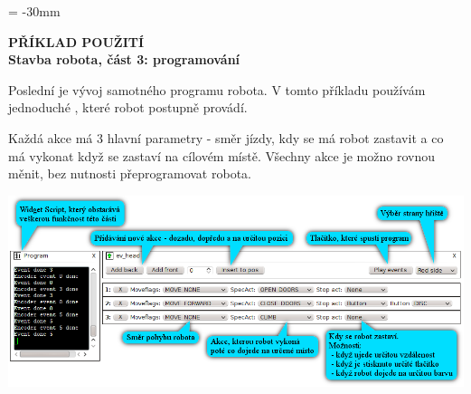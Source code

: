 \documentclass[12pt, a4paper, oneside]{article}
\newcommand{\B}{\textbf} %
\begin{document}
\newpage
\begin{landscape}
\voffset = -30mm %
\begin{center}
    \Large \B{PŘÍKLAD POUŽITÍ \\ Stavba robota, část 3: programování}
\end{center}
\vspace{5mm}
Poslední je vývoj samotného programu robota. V tomto příkladu používám jednoduché , které robot postupně provádí. 

Každá akce má 3 hlavní parametry - směr jízdy, kdy se má robot zastavit a co má vykonat když se zastaví na cílovém místě. Všechny akce je možno rovnou měnit, bez nutnosti přeprogramovat robota.
\begin{center}
\includegraphics[scale=1]{img/control2.png}
\end{center}
\end{landscape}
\end{document}
